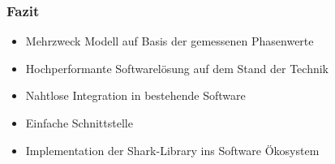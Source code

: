 \begin{frame}
  \frametitle{Fazit}
    \pause
    \begin{itemize}
    \item Mehrzweck Modell auf Basis der gemessenen Phasenwerte
    \item Hochperformante Softwarelösung auf dem Stand der Technik
    \item Nahtlose Integration in bestehende Software
    \item Einfache Schnittstelle
    \item Implementation der Shark-Library ins Software Ökosystem
%    
    \end{itemize}
\end{frame}
